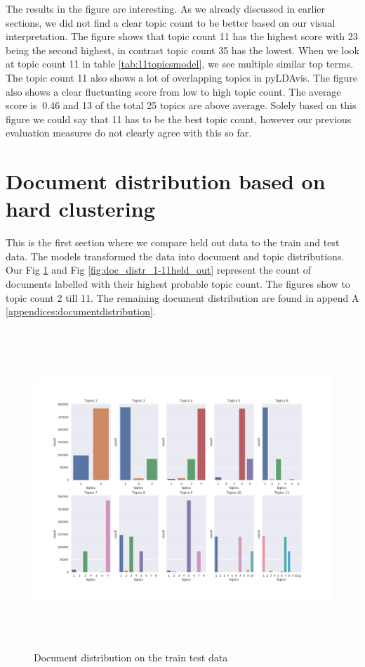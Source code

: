 The results in the figure are interesting. As we already discussed in earlier sections, we did not find a clear topic count to be better based on our visual interpretation. The figure shows that topic count 11 has the highest score with 23 being the second highest, in contrast topic count 35 has the lowest. When we look at topic count 11 in table \ref{tab:11topicsmodel}, we see multiple similar top terms. The topic count 11 also shows a lot of overlapping topics in pyLDAvis. The figure also shows a clear fluctuating score from low to high topic count. The average score is $~0.46$ and 13 of the total 25 topics are above average. Solely based on this figure we could say that 11 has to be the best topic count, however our previous evaluation measures do not clearly agree with this so far.

\FloatBarrier
\section{Document distribution based on hard clustering}\label{results:doc_distribution}
This is the first section where we compare held out data to the train and test data. The models transformed the data into document and topic distributions. Our Fig \ref{fig:doc_distr_1-11corpus} and Fig \ref{fig:doc_distr_1-11held_out} represent the count of documents labelled with their highest probable topic count. The figures show to topic count 2 till 11. The remaining document distribution are found in append A \ref{appendices:documentdistribution}.

\begin{figure}[h]
    \centering
    \includegraphics[width=16cm, height=12cm]{figures/doc_distr/doc_distribution_1-11_corpus.png}
    \caption{Document distribution on the train test data}
    \label{fig:doc_distr_1-11corpus}
\end{figure}
\FloatBarrier

